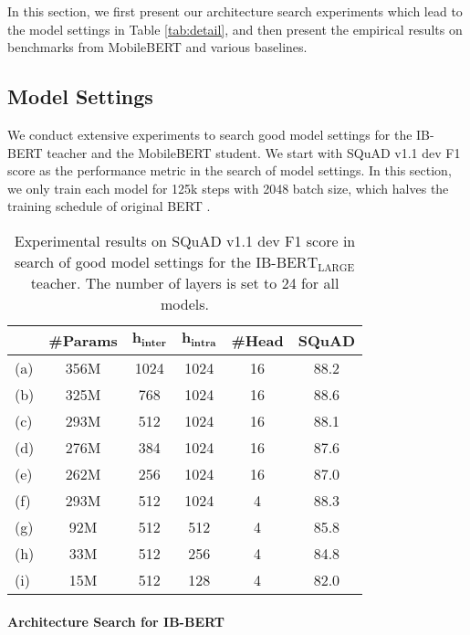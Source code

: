 \documentclass[11pt,a4paper]{article}
\begin{document}
In this section, we first present our architecture search experiments which lead to the model settings in Table \ref{tab:detail}, and then present the empirical results on benchmarks from MobileBERT and various baselines. 

\subsection{Model Settings} \label{sec:nas} 

We conduct extensive experiments to search good model settings for the IB-BERT teacher and the MobileBERT student.
We start with SQuAD v1.1 dev F1 score as the performance metric in the search of model settings. In this section, we only train each model for 125k steps with 2048 batch size, which halves the training schedule of original BERT \citep{devlin2018bert,you2019large}.

\setlength{\tabcolsep}{2pt}

\begin{table}[t]
\centering
	    \small
		\begin{tabular}{l c c c c c}
			\hline
			& \textbf{\#Params} & $\mathbf{h_{inter}}$ & $\mathbf{h_{intra}}$ & \textbf{\#Head} & \textbf{SQuAD}\\
			\hline
			(a) & 356M & 1024 & 1024 & 16 & 88.2 \\
			(b) & 325M & 768 & 1024 & 16 & 88.6 \\
			(c) & 293M & 512 & 1024 & 16 & 88.1 \\
			(d) & 276M & 384 & 1024 & 16 & 87.6 \\
			(e) & 262M & 256 & 1024 & 16 & 87.0 \\
			\hline
			(f) & 293M & 512 & 1024 & 4 & 88.3 \\
			(g) & 92M & 512 & 512 & 4 & 85.8 \\
			(h) & 33M & 512 & 256 & 4 & 84.8 \\
            (i) & 15M & 512 & 128 & 4 & 82.0 \\
			\hline
		\end{tabular}
\caption{Experimental results on SQuAD v1.1 dev F1 score in search of good model settings for the $\text{IB-BERT}_\text {LARGE}$ teacher.  The number of layers is set to 24 for all models.}
    \label{tab:bottleneck}
\end{table}
\setlength{\tabcolsep}{6pt}


\paragraph{Architecture Search for IB-BERT}
\end{document}
